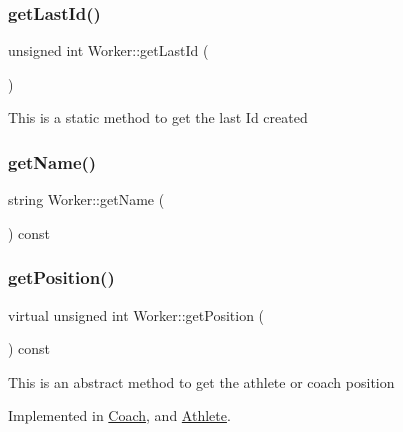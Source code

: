 \hypertarget{class_worker_ab2ad8ec70eb7a478a3525e5114689625}{}\label{class_worker_ab2ad8ec70eb7a478a3525e5114689625} 
\subsubsection{\texorpdfstring{get\+Last\+Id()}{getLastId()}}
{\footnotesize\ttfamily unsigned int Worker\+::get\+Last\+Id (\begin{DoxyParamCaption}{ }\end{DoxyParamCaption})\hspace{0.3cm}{\ttfamily [static]}}

This is a static method to get the last Id created \hypertarget{class_worker_aaaa5808dae61a91b5344224b0ec4d0aa}{}\label{class_worker_aaaa5808dae61a91b5344224b0ec4d0aa} 
\subsubsection{\texorpdfstring{get\+Name()}{getName()}}
{\footnotesize\ttfamily string Worker\+::get\+Name (\begin{DoxyParamCaption}{ }\end{DoxyParamCaption}) const}

\hypertarget{class_worker_a5fd37dea8c5e6579c1deecbfc1b22db9}{}\label{class_worker_a5fd37dea8c5e6579c1deecbfc1b22db9} 
\subsubsection{\texorpdfstring{get\+Position()}{getPosition()}}
{\footnotesize\ttfamily virtual unsigned int Worker\+::get\+Position (\begin{DoxyParamCaption}{ }\end{DoxyParamCaption}) const\hspace{0.3cm}{\ttfamily [pure virtual]}}

This is an abstract method to get the athlete or coach position 

Implemented in \hyperlink{class_coach_aa248ee0fec4a5dfdddb8c235ad4ae4a8}{Coach}, and \hyperlink{class_athlete_a18ca289d50900c3825f21d36f2bf8d75}{Athlete}.

\hypertarget{class_worker_a59b1b4769ad7cc740b051e53c986b725}{}\label{class_worker_a59b1b4769ad7cc740b051e53c986b725} 
